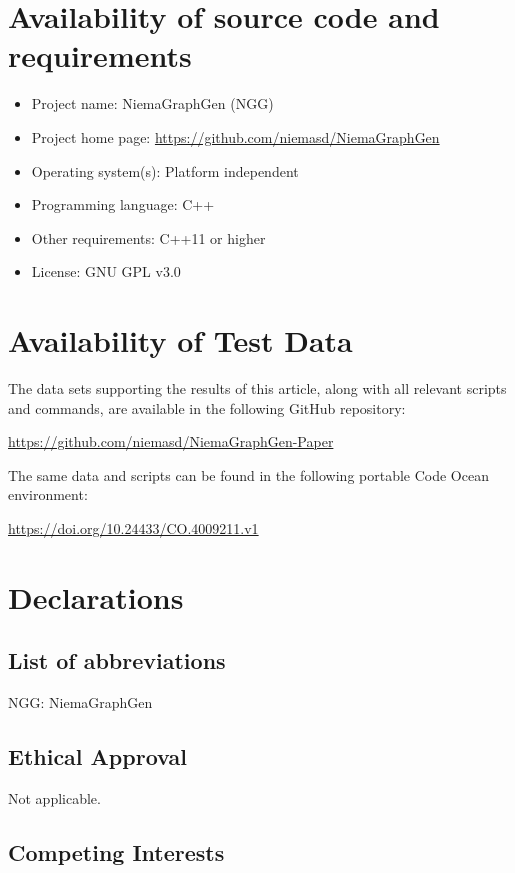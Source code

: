 \documentclass[a4paper,num-refs,gigabyte]{oup-contemporary}
\begin{document}
\section{Availability of source code and requirements}

\begin{itemize}
\item Project name: NiemaGraphGen (NGG)
\item Project home page: \url{https://github.com/niemasd/NiemaGraphGen}
\item Operating system(s): Platform independent
\item Programming language: C++
\item Other requirements: C++11 or higher
\item License: GNU GPL v3.0
\end{itemize}

\section{Availability of Test Data}

The data sets supporting the results of this article, along with all relevant scripts and commands, are available in the following GitHub repository:

\url{https://github.com/niemasd/NiemaGraphGen-Paper}

The same data and scripts can be found in the following portable Code Ocean environment:

\url{https://doi.org/10.24433/CO.4009211.v1}

\section{Declarations}

\subsection{List of abbreviations}
NGG: NiemaGraphGen

\subsection{Ethical Approval}
Not applicable.

\subsection{Competing Interests}
\end{document}
